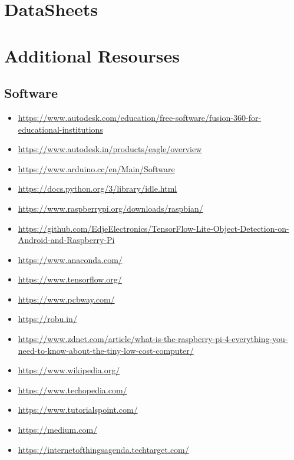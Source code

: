 \begin{appendices}
\chapter{DataSheets}
\chapter{Additional Resourses}
\section{Software}\label{SoftwareAppendix}

\begin{itemize}
\small
\item \url{https://www.autodesk.com/education/free-software/fusion-360-for-educational-institutions}\label{fusion360}

\item \url{https://www.autodesk.in/products/eagle/overview}\label{eagle}

\item \url{https://www.arduino.cc/en/Main/Software}\label{arduinoide}

\item \url{https://docs.python.org/3/library/idle.html}\label{pythonidle}

\item \url{https://www.raspberrypi.org/downloads/raspbian/}\label{raspbian}

\item \url{https://github.com/EdjeElectronics/TensorFlow-Lite-Object-Detection-on-Android-and-Raspberry-Pi}\label{edjeelectronics}

\item \url{https://www.anaconda.com/}

\item \url{https://www.tensorflow.org/}\label{tensorflow}

\item \url{https://www.pcbway.com/}

\item \url{https://robu.in/}

\item \url{https://www.zdnet.com/article/what-is-the-raspberry-pi-4-everything-you-need-to-know-about-the-tiny-low-cost-computer/}

\item \url{https://www.wikipedia.org/}

\item \url{https://www.techopedia.com/}

\item \url{https://www.tutorialspoint.com/}

\item \url{https://medium.com/}

\item \url{https://internetofthingsagenda.techtarget.com/}

\end{itemize}

\end{appendices}